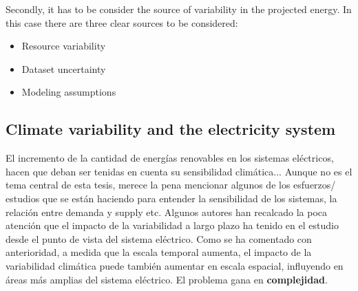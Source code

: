 Secondly, it has to be consider the source of variability in the projected energy. In this case there are three clear sources to be considered:

\begin{itemize}
 \item{Resource variability}
\item{Dataset uncertainty}
\item{Modeling assumptions}
\end{itemize}

 




\subsection{Climate variability and the electricity system}

El incremento de la cantidad de energías renovables en los sistemas eléctricos, hacen que deban ser tenidas en cuenta su sensibilidad climática...
Aunque no es el tema central de esta tesis, merece la pena mencionar algunos de los esfuerzos/ estudios que se están haciendo para entender la sensibilidad de los sistemas, la relación entre demanda y supply etc. Algunos autores han recalcado la poca atención que el impacto de la variabilidad a largo plazo ha tenido en el estudio desde el punto de vista del sistema eléctrico.
Como se ha comentado con anterioridad, a medida que la escala temporal aumenta, el impacto de la variabilidad climática puede también aumentar en escala espacial, influyendo en áreas más amplias del sistema eléctrico.
El problema gana en \textbf{complejidad}.

